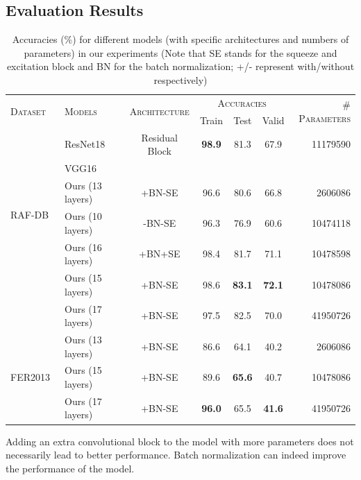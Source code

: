 \subsection{Evaluation Results}
\label{sec:evaluation:results}

\begin{table}[ht]
  \centering
  \begin{tabular}{@{}llccccr@{}}
    \toprule 
    \multirow{2}{*}{\textsc{Dataset}}&\multirow{2}{*}{\textsc{Models}}&\multirow{2}{*}{\textsc{Architecture}} & \multicolumn{3}{c}{\textsc{Accuracies}} & \multirow{2}{*}{\textsc{\# Parameters}} \\
    \cline{4-6}
    &&& Train & Test & Valid  &  \\
    \midrule
    \multirow{6}{*}{RAF-DB~\cite{li_reliable_2017,li2019reliable}}     & ResNet18~\cite{HeZRS16} & Residual Block  & \textbf{98.9} & 81.3 & 67.9 & 11179590 \\
    &VGG16~\cite{SimonyanZ14a} &&&&&\\
    &Ours (13 layers) & +BN-SE & 96.6 & 80.6 & 66.8 & 2606086 \\ 
    &Ours (10 layers) & -BN-SE & 96.3 & 76.9 & 60.6 & 10474118 \\
    &Ours (16 layers) & +BN+SE & 98.4 & 81.7 & 71.1 & 10478598 \\
    &Ours (15 layers) & +BN-SE & 98.6 & \textbf{83.1} & \textbf{72.1} & 10478086 \\
    &Ours (17 layers) & +BN-SE & 97.5 & 82.5 & 70.0 & 41950726 \\ 
    \midrule
    \multirow{3}{*}{FER2013~\cite{BarsoumZCZ16}} & Ours (13 layers) & +BN-SE & 86.6 & 64.1 & 40.2 & 2606086 \\
    &Ours (15 layers) & +BN-SE & 89.6 & \textbf{65.6} & 40.7 & 10478086 \\
    &Ours (17 layers) & +BN-SE & \textbf{96.0} & 65.5 & \textbf{41.6} & 41950726 \\
    \bottomrule
  \end{tabular}
  \caption{Accuracies (\%) for different models (with specific architectures and numbers of parameters) in our experiments 
  (Note that SE stands for the squeeze and excitation block and BN for the batch normalization; 
  +/- represent with/without respectively)}
  \label{tab:model}
\end{table}

Adding an extra convolutional block to the model with more parameters does not necessarily lead to better performance.
Batch normalization can indeed improve the performance of the model. 

